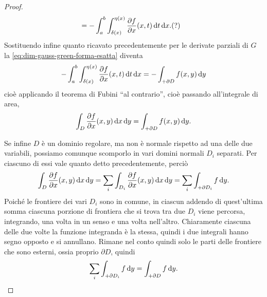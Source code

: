 \begin{proof}
\begin{equation}
\begin{split}
			&=-\int_a^b\int_{\delta(x)}^{\eta(x)}\frac{\partial {f}}{\partial {x}}(x,t)\,\textup{d} t\,\textup{d} x. (?)
		\end{split}
	\end{equation}
	Sostituendo infine quanto ricavato precedentemente per le derivate parziali di $G$ la \eqref{eq:dim-gauss-green-forma-esatta} diventa
	\begin{equation}
		-\int_a^b\int_{\delta(x)}^{\eta(x)}\frac{\partial {f}}{\partial {x}}(x,t)\,\textup{d} t\,\textup{d} x=-\int_{+\partial D}f(x,y)\,\textup{d} y
	\end{equation}
	cioè applicando il teorema di Fubini ``al contrario'', cioè passando all'integrale di area,
	\begin{equation}
		\int_D\frac{\partial {f}}{\partial {x}}(x,y)\,\textup{d} x\,\textup{d} y=\int_{+\partial D}f(x,y)\,\textup{d} y.
	\end{equation}

	Se infine $D$ è un dominio regolare, ma non è normale rispetto ad una delle due variabili, possiamo comunque scomporlo in vari domini normali $D_i$ separati.
	Per ciascuno di essi vale quanto detto precedentemente, perciò
	\begin{equation}
		\int_D\frac{\partial {f}}{\partial {x}}(x,y)\,\textup{d} x\,\textup{d} y=\sum_i\int_{D_i}\frac{\partial {f}}{\partial {x}}(x,y)\,\textup{d} x\,\textup{d} y=\sum_i\int_{+\partial D_i}f\,\textup{d} y.
	\end{equation}
	Poich\'e le frontiere dei vari $D_i$ sono in comune, in ciascun addendo di quest'ultima somma ciascuna porzione di frontiera che si trova tra due $D_i$ viene percorsa, integrando, una volta in un senso e una volta nell'altro.
	Chiaramente ciascuna delle due volte la funzione integranda è la stessa, quindi i due integrali hanno segno opposto e si annullano.
	Rimane nel conto quindi solo le parti delle frontiere che sono esterni, ossia proprio $\partial D$, quindi
	\begin{equation}
		\sum_i\int_{+\partial D_i}f\,\textup{d} y=\int_{+\partial D}f\,\textup{d} y.\qedhere
	\end{equation}
\end{proof}

